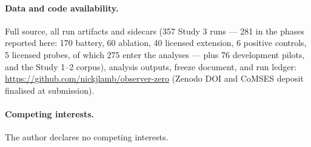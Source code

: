 \documentclass[11pt]{article}
\begin{document}
\paragraph{Data and code availability.} Full source, all run artifacts and sidecars (357 Study 3 runs --- 281 in the phases reported here: 170 battery, 60 ablation, 40 licensed extension, 6 positive controls, 5 licensed probes, of which 275 enter the analyses --- plus 76 development pilots, and the Study 1--2 corpus), analysis outputs, freeze document, and run ledger: \url{https://github.com/nickjlamb/observer-zero} (Zenodo DOI and CoMSES deposit finalised at submission).

\paragraph{Competing interests.} The author declares no competing interests.
\end{document}

